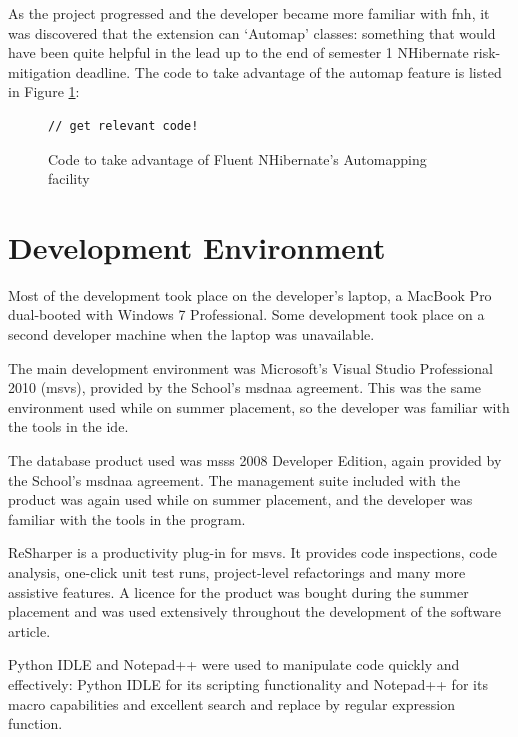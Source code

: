 As the project progressed and the developer became more familiar with \gls{fnh}, it was discovered that the extension can `Automap' classes: something that would have been quite helpful in the lead up to the end of semester 1 NHibernate risk-mitigation deadline.
The code to take advantage of the automap feature is listed in Figure \ref{fig:fnhCode}:

\revisit

\begin{figure}
	\begin{center}
			\lstset{language=CSharp} 
			\begin{lstlisting}
// get relevant code!
			\end{lstlisting}
		\caption{Code to take advantage of Fluent NHibernate's Automapping facility}
		\label{fig:fnhCode}
	\end{center}
\end{figure}

\section{Development Environment}
\label{devEnv}
Most of the development took place on the developer's laptop, a MacBook Pro dual-booted with Windows 7 Professional.  Some development took place on a second developer machine when the laptop was unavailable.

The main development environment was Microsoft's Visual Studio Professional 2010 (\gls{msvs}), provided by the School's \gls{msdnaa} agreement.  This was the same environment used while on summer placement, so the developer was familiar with the tools in the \gls{ide}.

The database product used was \gls{msss} 2008 Developer Edition, again provided by the School's \gls{msdnaa} agreement. The management suite included with the product was again used while on summer placement, and the developer was familiar with the tools in the program.

ReSharper is a productivity plug-in for \gls{msvs}.  It provides code inspections, code analysis, one-click unit test runs, project-level refactorings and many more assistive features. A licence for the product was bought during the summer placement and was used extensively throughout the development of the software article.

Python IDLE and Notepad++ were used to manipulate code quickly and effectively: Python IDLE for its scripting functionality and Notepad++ for its macro capabilities and excellent search and replace by regular expression function.


